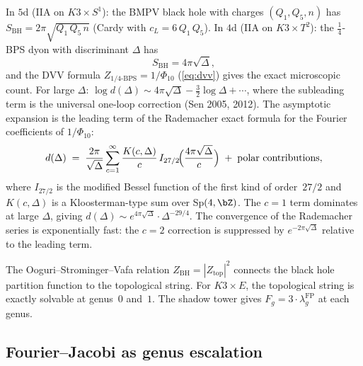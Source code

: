 \begin{proposition}
\label{prop:bmpv}
In $5$d \textup{(}IIA on $K3 \times S^1$\textup{)}: the BMPV black hole
with charges $(Q_1, Q_5, n)$ has
$S_{\mathrm{BH}} = 2\pi\sqrt{Q_1\,Q_5\,n}$
\textup{(}Cardy with $c_L = 6\,Q_1\,Q_5$\textup{)}.
In $4$d \textup{(}IIA on $K3 \times T^2$\textup{)}: the
$\frac{1}{4}$-BPS dyon with discriminant $\Delta$ has
\[
S_{\mathrm{BH}} = 4\pi\sqrt{\Delta},
\]
and the DVV formula $Z_{1/4\text{-BPS}} = 1/\Phi_{10}$
\textup{(}\eqref{eq:dvv}\textup{)} gives the exact microscopic count.
For large $\Delta$:
$\log d(\Delta) \sim 4\pi\sqrt{\Delta} -
\frac{3}{2}\log\Delta + \cdots$,
where the subleading term is the universal one-loop correction
\textup{(}Sen 2005, 2012\textup{)}.
The asymptotic expansion is the leading term of the Rademacher
exact formula for the Fourier coefficients of $1/\Phi_{10}$:
\[
d(\Delta) \;=\; \frac{2\pi}{\sqrt{\Delta}}
\sum_{c=1}^{\infty} \frac{K(c,\Delta)}{c}\,
I_{27/2}\!\Bigl(\frac{4\pi\sqrt{\Delta}}{c}\Bigr)
\;+\; \text{polar contributions},
\]
where $I_{27/2}$ is the modified Bessel function of the first
kind of order~$27/2$ and $K(c,\Delta)$ is a Kloosterman-type
sum over Sp$(4,\bZ)$. The $c = 1$ term dominates at large
$\Delta$, giving
$d(\Delta) \sim e^{4\pi\sqrt{\Delta}} \cdot \Delta^{-29/4}$.
The convergence of the Rademacher series is exponentially fast:
the $c = 2$ correction is suppressed by $e^{-2\pi\sqrt{\Delta}}$
relative to the leading term.
\end{proposition}

\begin{remark}
\label{rem:osv}
The Ooguri--Strominger--Vafa relation
$Z_{\mathrm{BH}} = |Z_{\mathrm{top}}|^2$ connects the black hole
partition function to the topological string. For $K3 \times E$,
the topological string is exactly solvable at genus~$0$ and~$1$.
The shadow tower gives $F_g = 3 \cdot \lambda_g^{\mathrm{FP}}$ at each genus.
\end{remark}


\subsection{Fourier--Jacobi as genus escalation}
\label{subsec:bridge-fourier-jacobi}

